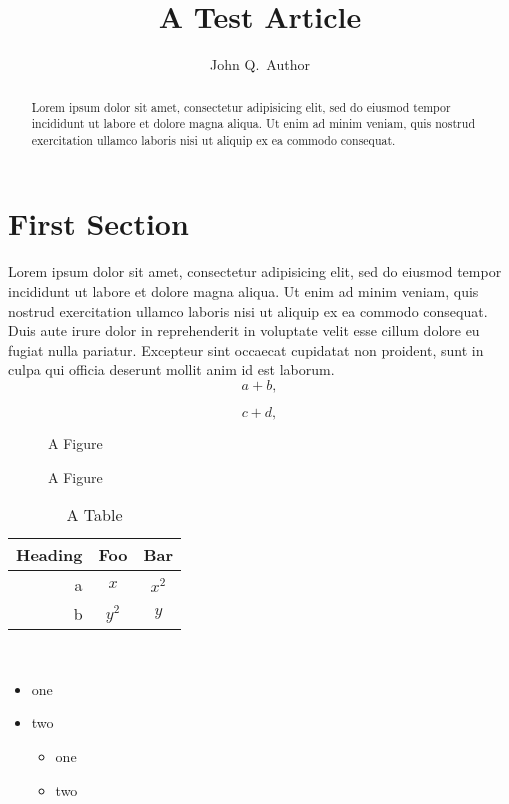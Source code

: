 \documentclass{article}
\title{A Test Article}
\author{John Q.~Author}
\begin{document}
\maketitle

\begin{abstract}
Lorem ipsum dolor sit amet, consectetur adipisicing elit, sed do eiusmod tempor incididunt ut labore et dolore magna aliqua. Ut enim ad minim veniam, quis nostrud exercitation ullamco laboris nisi ut aliquip ex ea commodo consequat.
\end{abstract}

\section{First Section}
Lorem ipsum dolor sit amet, consectetur adipisicing elit, sed do eiusmod tempor incididunt ut labore et dolore magna aliqua. Ut enim ad minim veniam, quis nostrud exercitation ullamco laboris nisi ut aliquip ex ea commodo consequat. Duis aute irure dolor in reprehenderit in voluptate velit esse cillum dolore eu fugiat nulla pariatur. Excepteur sint occaecat cupidatat non proident, sunt in culpa qui officia deserunt mollit anim id est laborum.
\begin{equation}
 a + b,
\end{equation}

\begin{equation}
 c + d,
\end{equation}

\begin{figure}
\begin{centering}
A Figure\\
\end{centering}
\caption{A Figure}
\end{figure}

\begin{table}
\begin{centering}
\begin{tabular}{r|cc}
Heading & Foo & Bar\\\hline
a & $x$ & $x^2$\\
b & $y^2$ & $y$\\
\end{tabular}\\
\end{centering}
\caption{A Table}
\end{table}

\begin{itemize}
 \item one
 \item two
   \begin{itemize}
    \item one
    \item two
   \end{itemize}
\end{itemize}
\end{document}
